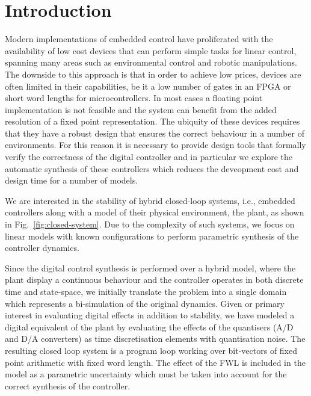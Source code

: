 \documentclass{sig-alternate-05-2015}
\begin{document}
%
%
\printccsdesc



\section{Introduction}

Modern implementations of embedded control have proliferated with the availability of low cost devices that can perform simple tasks for linear control, spanning many areas such as environmental control and robotic manipulations. The downside to this approach is that in order to achieve low prices, devices are often limited in their capabilities, be it a low number of gates in an FPGA or short word lengths for microcontrollers. In most cases a floating point implementation is not feasible and the system can benefit from the added resolution of a fixed point representation. The ubiquity of these devices requires that they have a robust design that ensures the correct behaviour in a number of environments.
For this reason it is necessary to provide design tools that formally verify the correctness of the digital controller and in particular we explore the automatic synthesis of these controllers which reduces the deveopment cost and design time for a number of models.

We are interested in the stability of hybrid closed-loop systems, i.e.,
embedded controllers along with a model of their physical environment, the
plant, as shown in Fig.~\ref{fig:closed-system}. Due to the complexity of such systems, we focus on linear models with known configurations to perform parametric synthesis of the controller dynamics. 

Since the digital control synthesis is performed over a hybrid model, where the plant display a continuous behaviour and the controller operates in both discrete time and state-space, we initially translate the problem into a single domain which represents a bi-simulation of the original dynamics. Given or primary interest in evaluating digital effects in addition to stability, we have modeled a digital equivalent of the plant by evaluating the effects of the quantisers (A/D and D/A converters) as time discretisation elements with quantisation noise.
The resulting closed loop system is a program loop working over bit-vectors of fixed point arithmetic with fixed word length. The effect of the FWL is included in the model as a parametric uncertainty which must be taken into account for the correct synthesis of the controller. 
\end{document}
